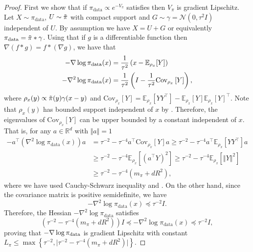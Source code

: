 \begin{proof}
 First we show that if $\pi_{\text{data}}\propto e^{-V_\pi}$ satisfies  then $V_\pi$ is gradient Lipschitz. 
 Let $X\sim\pi_{\text{data}}$, $U\sim\Tilde{\pi}$ with compact support and $G\sim\gamma=\mathcal{N}(0, \tau^2I)$ independent of $U$. By assumption  we have $X = U + G$ or equivalently $\pi_{\text{data}} = \Tilde{\pi}*\gamma$. 
 Using that if $g$ is a differentiable function then $\nabla(f*g) = f * (\nabla g)$, we have that
\begin{align}
-\nabla\log\operatorname*{\pi_{\text{data}}}(x) &= \frac{1}{\tau^2}\left(x-\mathbb{E}_{\rho_x}[Y]\right) \label{eq:covariance_compact_plus_gaussian_score}\\
    -\nabla^2 \log\pi_{\text{data}}(x) &= \frac{1}{\tau^2}\left(I -\frac{1}{\tau^2} \text{Cov}_{{\rho_x}} \left[Y\right]\right), \label{eq:covariance_compact_plus_gaussian_hessian}
\end{align}
where $\rho_x(y) \propto \Tilde{\pi}(y)\gamma(x-y)$ and $\text{Cov}_{\rho_x}[Y] = \mathbb{E}_{\rho_x}[Y Y^\intercal] - \mathbb{E}_{\rho_x}[Y] \mathbb{E}_{\rho_x}[Y]^\intercal$.
Note that $\rho_x(y)$ has bounded support independent of $x$ by . Therefore, the eigenvalues of $\text{Cov}_{{\rho_x}} \left[Y\right]$ can be upper bounded by a constant independent of $x$. 
That is, for any $a\in\mathbb{R}^d$ with $\Vert a\Vert=1$
\begin{align*}
    -a^{\intercal}\left(\nabla^2 \log \pi_{\text{data}}(x)\right) a &= \tau^{-2} -\tau^{-4} a^{\intercal} \text{Cov}_{\rho_x}\left[Y\right]a\geq \tau^{-2}  - \tau^{-4} a^\intercal \mathbb{E}_{\rho_x}[Y Y^\intercal] a\\
    &\geq \tau^{-2} -\tau^{-4} \mathbb{E}_{\rho_x}\left[(a^{\intercal}Y)^2\right] \geq \tau^{-2}  -\tau^{-4}  \mathbb{E}_{\rho_x}[\Vert Y \Vert^2] \\
    &\geq \tau^{-2}-\tau^{-4} (m_\pi + dR^2),
\end{align*}
where we have used Cauchy-Schwarz inequality and .
On the other hand, since the covariance matrix is positive semidefinite, we have
\begin{equation*}
    -\nabla^2 \log\pi_{\text{data}} (x)\preccurlyeq \tau^{-2} I.
\end{equation*}
Therefore, the Hessian $-\nabla^2\log\pi_{\text{data}}$ satisfies
\begin{equation*}
     \left(\tau^{-2}-\tau^{-4} (m_\pi + dR^2)\right) I \preccurlyeq -\nabla^2 \log \pi_{\text{data}}(x) \preccurlyeq \tau^{-2} I,
\end{equation*}
proving that $-\nabla\log\operatorname*{\pi_{\text{data}}}$ is gradient Lipschitz with constant $L_\pi\leq \max\left\lbrace \tau^{-2}, \vert\tau^{-2}-\tau^{-4} (m_\pi + dR^2)\vert \right\rbrace$.


\end{proof}
